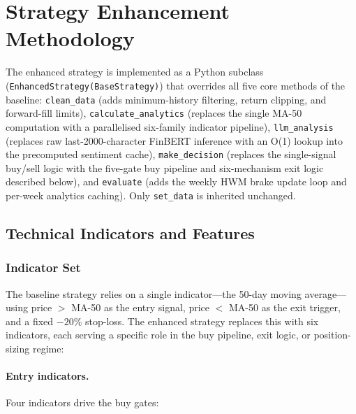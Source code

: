 \documentclass[11pt,twoside,a4paper]{article}
\begin{document}
\section{Strategy Enhancement Methodology}

The enhanced strategy is implemented as a Python subclass (\texttt{EnhancedStrategy(BaseStrategy)}) that overrides all five core methods of the baseline: \texttt{clean\_data} (adds minimum-history filtering, return clipping, and forward-fill limits), \texttt{calculate\_analytics} (replaces the single MA-50 computation with a parallelised six-family indicator pipeline), \texttt{llm\_analysis} (replaces raw last-2000-character FinBERT inference with an O(1) lookup into the precomputed sentiment cache), \texttt{make\_decision} (replaces the single-signal buy/sell logic with the five-gate buy pipeline and six-mechanism exit logic described below), and \texttt{evaluate} (adds the weekly HWM brake update loop and per-week analytics caching). Only \texttt{set\_data} is inherited unchanged.

\subsection{Technical Indicators and Features}

\subsubsection{Indicator Set}

The baseline strategy relies on a single indicator---the 50-day moving average---using price $>$ MA-50 as the entry signal, price $<$ MA-50 as the exit trigger, and a fixed $-20\%$ stop-loss. The enhanced strategy replaces this with six indicators, each serving a specific role in the buy pipeline, exit logic, or position-sizing regime:

\paragraph{Entry indicators.}
Four indicators drive the buy gates:
\end{document}
